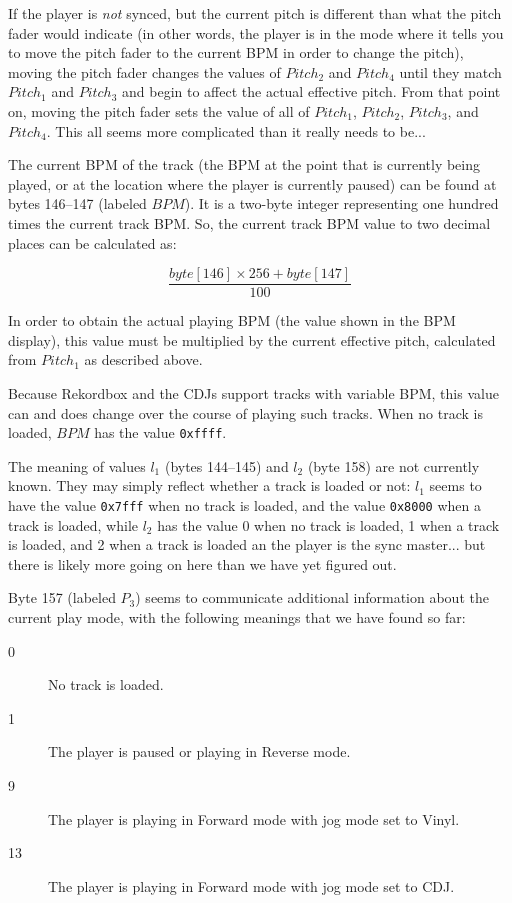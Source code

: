 \documentclass[11pt]{article}
\begin{document}
If the player is \emph{not} synced, but the current pitch is different
than what the pitch fader would indicate (in other words, the player
is in the mode where it tells you to move the pitch fader to the
current BPM in order to change the pitch), moving the pitch fader
changes the values of $Pitch_2$ and $Pitch_4$ until they match
$Pitch_1$ and $Pitch_3$ and begin to affect the actual effective
pitch. From that point on, moving the pitch fader sets the value of
all of $Pitch_1$, $Pitch_2$, $Pitch_3$, and $Pitch_4$. This all seems
more complicated than it really needs to be...

The current BPM of the track (the BPM at the point that is currently
being played, or at the location where the player is currently paused)
can be found at bytes 146--147 (labeled $BPM$). It is a two-byte
integer representing one hundred times the current track BPM. So, the
current track BPM value to two decimal places can be calculated as:

\[ \frac{byte[146] \times 256 + byte[147]}{100} \]

In order to obtain the actual playing BPM (the value shown in the BPM
display), this value must be multiplied by the current effective
pitch, calculated from $Pitch_1$ as described above.

Because Rekordbox and the CDJs support tracks with variable BPM, this
value can and does change over the course of playing such tracks. When
no track is loaded, $BPM$ has the value {\tt 0xffff}.

The meaning of values $l_1$ (bytes 144--145) and $l_2$ (byte 158) are
not currently known. They may simply reflect whether a track is loaded
or not: $l_1$ seems to have the value {\tt 0x7fff} when no track is
loaded, and the value {\tt 0x8000} when a track is loaded, while $l_2$
has the value 0 when no track is loaded, 1 when a track is loaded, and
2 when a track is loaded an the player is the sync master... but there
is likely more going on here than we have yet figured out.

Byte 157 (labeled $P_3$) seems to communicate additional information
about the current play mode, with the following meanings that we have
found so far:
\begin{description}
\item[0] No track is loaded.
\item[1] The player is paused or playing in Reverse mode.
\item[9] The player is playing in Forward mode with jog mode set to Vinyl.
\item[13] The player is playing in Forward mode with jog mode set to CDJ.
\end{description}
\end{document}
